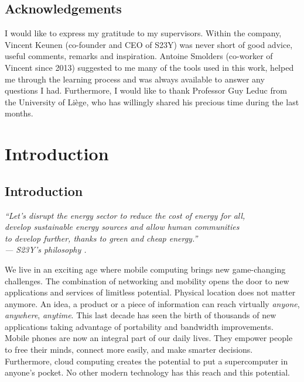 \documentclass[a4paper, oneside, 11pt]{book}
\newcommand\partcontent{}
\newcommand{\littleCite}[1]{\begin{flushright}\small\color{gray}\emph{#1}\end{flushright}}
\begin{document}
\chapter{Acknowledgements}
I would like to express my gratitude to my supervisors. Within the company, Vincent Keunen (co-founder and CEO of S23Y) was never short of good advice, useful comments, remarks and inspiration. Antoine Smolders (co-worker of Vincent since 2013) suggested to me many of the tools used in this work, helped me through the learning process and was always available to answer any questions I had. Furthermore, I would like to thank Professor Guy Leduc from the University of Liège, who has willingly shared his precious time during the last months.


\tableofcontents 
\listoffigures   

\mainmatter
\part{Introduction}
\renewcommand\partcontent{INTRODUCTION: }
\chapter{Introduction}
\littleCite{“Let's disrupt the energy sector to reduce the cost of energy for all, \\
develop sustainable energy sources and allow human communities \\
to develop further, thanks to green and cheap energy.” \\
---	S23Y’s philosophy {\hypersetup{citecolor=gray}\cite{S23Y:online}}. }

\noindent
We live in an exciting age where mobile computing brings new game-changing challenges. The combination of networking and mobility opens the door to new applications and services of limitless potential. Physical location does not matter anymore. An idea, a product or a piece of information can reach virtually \emph{anyone}, \emph{anywhere}, \emph{anytime}. This last decade has seen the birth of thousands of new applications taking advantage of portability and bandwidth improvements. Mobile phones are now an integral part of our daily lives. They empower people to free their minds, connect more easily, and make smarter decisions. Furthermore, cloud computing creates the potential to put a supercomputer in anyone’s pocket. No other modern technology has this reach and this potential. \\
\end{document}
